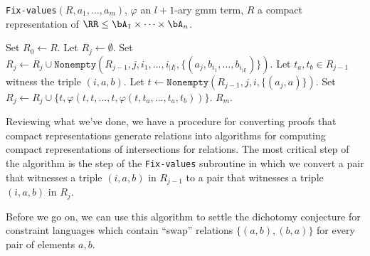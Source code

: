 \begin{algorithm}
\caption{\texttt{Fix-values}$(R, a_1, ..., a_m)$, $\varphi$ an $l+1$-ary gmm term, $R$ a compact representation of $\RR \le \bA_1\times \cdots\times \bA_n$.}
\begin{algorithmic}[1]
\State Set $R_0 \gets R$.
\State Let $R_j \gets \emptyset$.
\State Set $R_j \gets R_j \cup \texttt{Nonempty}(R_{j-1},j,i_1,...,i_{|I|},\{(a_j,b_{i_1},...,b_{i_{|I|}})\})$.
\EndFor
{}%
\State Let $t_a,t_b \in R_{j-1}$ witness the triple $(i,a,b)$.%
\State Let $t \gets \texttt{Nonempty}(R_{j-1},j,i,\{(a_{j},a)\})$.
\State Set $R_{j} \gets R_{j} \cup \{t, \varphi(t,t,...,t,\varphi(t,t_a,...,t_a,t_b))\}$.
\EndIf
\EndFor
\EndFor
\State \Return $R_m$.
\end{algorithmic}
\end{algorithm}

Reviewing what we've done, we have a procedure for converting proofs that compact representations generate relations into algorithms for computing compact representations of intersections for relations. The most critical step of the algorithm is the step of the \texttt{Fix-values} subroutine in which we convert a pair that witnesses a triple $(i,a,b)$ in $R_{j-1}$ to a pair that witnesses a triple $(i,a,b)$ in $R_j$.

Before we go on, we can use this algorithm to settle the dichotomy conjecture for constraint languages which contain ``swap'' relations $\{(a,b),(b,a)\}$ for every pair of elements $a,b$.

